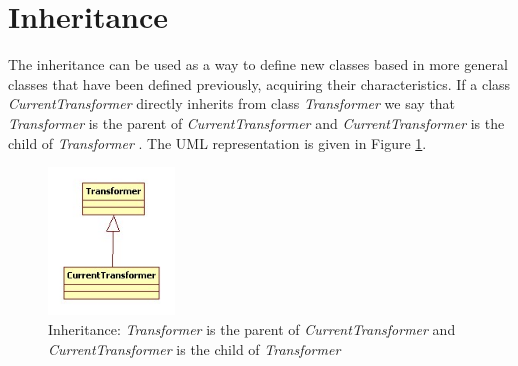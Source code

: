 \section{Inheritance}

The inheritance can be used as a way to define new classes 
based in more general classes that have been 
defined previously, acquiring their characteristics.  
If a class \emph{CurrentTransformer} directly 
inherits from class \emph{Transformer} we say that 
\emph{Transformer} is the parent 
of \emph{CurrentTransformer} and 
\emph{CurrentTransformer} is the 
child of \emph{Transformer} \cite{Snyder:1986}. 
The UML representation is given in 
Figure \ref{fig:inheritance-fig}.



\begin{figure}
  \includegraphics[width=0.3\textwidth]{chapters/ch-oop/figures/inheritance}
  \caption{
  		Inheritance: \emph{Transformer} is the parent 
		of \emph{CurrentTransformer} and 
		\emph{CurrentTransformer} is the 
		child of \emph{Transformer}
		}
  \label{fig:inheritance-fig}
\end{figure}

